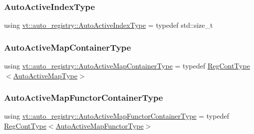 \mbox{\label{namespacevt_1_1auto__registry_ad5ff1c3344b954a1e1212c72c74e4a7a}} 
\subsubsection{\texorpdfstring{Auto\+Active\+Index\+Type}{AutoActiveIndexType}}
{\footnotesize\ttfamily using \hyperlink{namespacevt_1_1auto__registry_ad5ff1c3344b954a1e1212c72c74e4a7a}{vt\+::auto\+\_\+registry\+::\+Auto\+Active\+Index\+Type} = typedef std\+::size\+\_\+t}

\mbox{\label{namespacevt_1_1auto__registry_a9c5b8f15bca7b0ca4d56cae7c9f85d12}} 
\subsubsection{\texorpdfstring{Auto\+Active\+Map\+Container\+Type}{AutoActiveMapContainerType}}
{\footnotesize\ttfamily using \hyperlink{namespacevt_1_1auto__registry_a9c5b8f15bca7b0ca4d56cae7c9f85d12}{vt\+::auto\+\_\+registry\+::\+Auto\+Active\+Map\+Container\+Type} = typedef \hyperlink{namespacevt_1_1auto__registry_a988a4943e4c8fe82b56f5b13bddceb2b}{Reg\+Cont\+Type}$<$\hyperlink{namespacevt_1_1auto__registry_a03898a246ff1a8ce8ee4071a0391b386}{Auto\+Active\+Map\+Type}$>$}

\mbox{\label{namespacevt_1_1auto__registry_a531e799a0af154cbf069df74aec0f765}} 
\subsubsection{\texorpdfstring{Auto\+Active\+Map\+Functor\+Container\+Type}{AutoActiveMapFunctorContainerType}}
{\footnotesize\ttfamily using \hyperlink{namespacevt_1_1auto__registry_a531e799a0af154cbf069df74aec0f765}{vt\+::auto\+\_\+registry\+::\+Auto\+Active\+Map\+Functor\+Container\+Type} = typedef \hyperlink{namespacevt_1_1auto__registry_a988a4943e4c8fe82b56f5b13bddceb2b}{Reg\+Cont\+Type}$<$\hyperlink{namespacevt_1_1auto__registry_ab095554f67e143f84fe337bd85affde5}{Auto\+Active\+Map\+Functor\+Type}$>$}

